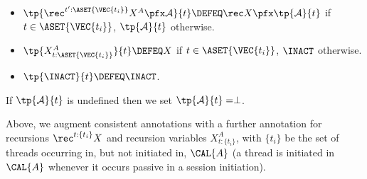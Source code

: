 \begin{definition}
{\begin{itemize}
\item[] 
  $\tp{\rec^{t':\ASET{\VEC{t_i}}} X^A\pfx\mathcal A}{t}
  \DEFEQ\rec X\pfx\tp{\mathcal A}{t}$ if
  $t\in\ASET{\VEC{t_i}}$, $\tp{\mathcal A}{t}$ otherwise.\\
\item[] 
  $\tp{X^A_{t:\ASET{\VEC{t_i}}}}{t}
  \DEFEQ X$ if $t\in\ASET{\VEC{t_i}}$, $\INACT$ otherwise.\\
\item[]
  $\tp{\INACT}{t}                                           
  \DEFEQ  \INACT$.
\end{itemize}
If $\tp{\mathcal{A}}{t}$ is undefined then we set
$\tp{\mathcal{A}}{t}=\perp$.}
\end{definition}

Above, we augment consistent annotations with a further annotation for
recursions $\rec^{t:\{t_i\}} X$
 and recursion variables $X^A
_{t:\{t_i\}}$, with  
 $\{t_i\}$ be the set of threads occurring in,
but not initiated in, $\CAL{A}$ (a thread is initiated in $\CAL{A}$
whenever it occurs passive in a session initiation). 

